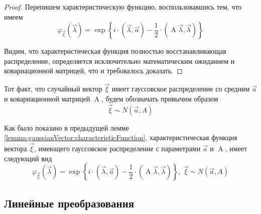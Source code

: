 \begin{proof}
    Перепишем характеристическую функцию, воспользовавшись тем, что имеем
    $$\varphi_{\vec{\xi}}\left( \vec{\lambda} \right)
        = \exp{\left\{ i \cdot \left( \vec{\lambda}, \vec{a} \right)
            - \frac{1}{2} \cdot \left( \operatorname{A} \vec{\lambda} ,
                \vec{\lambda} \right) \right\}}$$

    Видим, что характеристическая функция полностью восстанавливающая
    распределение, определяется исключительно математическим ожиданием
    и ковариационной матрицей, что и требовалось доказать.
\end{proof}

\begin{definition}
    Тот факт, что случайный вектор $\vec{\xi}$ имеет гауссовское распределение
    со средним $\vec{a}$ и ковариационной матрицей
    $\operatorname{A}$, будем обозначать привычнм образом
    $$\vec{\xi} \sim N\left( \vec{a}, A \right)$$
\end{definition}

\begin{remark}
    \label{remark:gaussianVector:characteristicFunction}
    Как было показано в предыдущей лемме
    \ref{lemma:gaussianVector:characteristicFunction}, характеристическая
    функция вектора $\vec{\xi}$, имеющего гауссовское распределение с
    параметрами $\vec{a}$ и $\operatorname{A}$, имеет следующий вид
    $$\varphi_{\vec{\xi}}\left( \vec{\lambda} \right)
        = \exp{\left\{ i \cdot \left( \vec{\lambda}, \vec{a} \right)
            - \frac{1}{2} \cdot \left( \operatorname{A} \vec{\lambda} ,
                \vec{\lambda} \right) \right\}},\;
        \vec{\xi} \sim N\left( \vec{a}, A \right)$$
\end{remark}

\subsection{Линейные преобразования}

